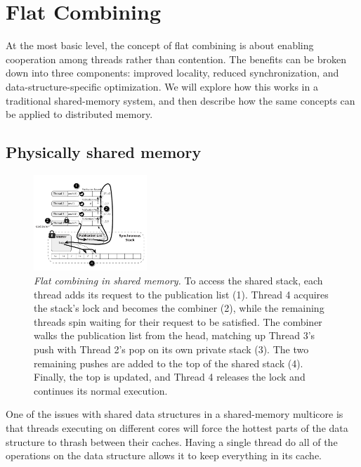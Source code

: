\section{Flat Combining}

At the most basic level, the concept of flat combining is about enabling cooperation among threads rather than contention. The benefits can be broken down into three components: improved locality, reduced synchronization, and data-structure-specific optimization. We will explore how this works in a traditional shared-memory system, and then describe how the same concepts can be applied to distributed memory.


\subsection{Physically shared memory}

\begin{figure}[t]
  \centering
  \includegraphics[width=0.38\textwidth]{figs/fc_shared_mem.pdf}
  \caption{\emph{Flat combining in shared memory.}
    To access the shared stack, each thread adds its request to the publication list (1). Thread 4 acquires the stack's lock and becomes the combiner (2), while the remaining threads spin waiting for their request to be satisfied. The combiner walks the publication list from the head, matching up Thread 3's push with Thread 2's pop on its own private stack (3). The two remaining pushes are added to the top of the shared stack (4). Finally, the top is updated, and Thread 4 releases the lock and continues its normal execution.
  }
  \label{fig:fc_shared_mem}
\end{figure}

One of the issues with shared data structures in a shared-memory multicore is that threads executing on different cores will force the hottest parts of the data structure to thrash between their caches. Having a single thread do all of the operations on the data structure allows it to keep everything in its cache.


